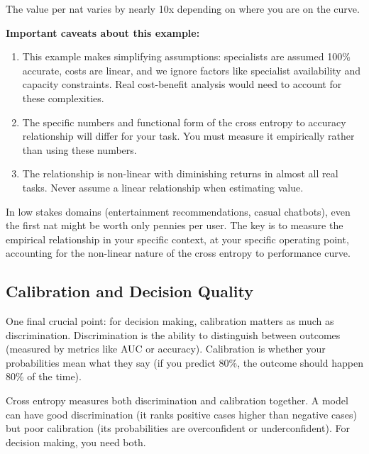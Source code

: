 \begin{examplebox}
The value per nat varies by nearly 10x depending on where you are on the curve.

\vspace{0.5em}

\textbf{Important caveats about this example:}

\begin{enumerate}
\item This example makes simplifying assumptions: specialists are assumed 100\% accurate, costs are linear, and we ignore factors like specialist availability and capacity constraints. Real cost-benefit analysis would need to account for these complexities.

\item The specific numbers and functional form of the cross entropy to accuracy relationship will differ for your task. You must measure it empirically rather than using these numbers.

\item The relationship is non-linear with diminishing returns in almost all real tasks. Never assume a linear relationship when estimating value.
\end{enumerate}
\end{examplebox}

\vspace{1.5em}

In low stakes domains (entertainment recommendations, casual chatbots), even the first nat might be worth only pennies per user. The key is to measure the empirical relationship in your specific context, at your specific operating point, accounting for the non-linear nature of the cross entropy to performance curve.

\subsection{Calibration and Decision Quality}

One final crucial point: for decision making, calibration matters as much as discrimination. Discrimination is the ability to distinguish between outcomes (measured by metrics like AUC or accuracy). Calibration is whether your probabilities mean what they say (if you predict 80\%, the outcome should happen 80\% of the time).

Cross entropy measures both discrimination and calibration together. A model can have good discrimination (it ranks positive cases higher than negative cases) but poor calibration (its probabilities are overconfident or underconfident). For decision making, you need both.

